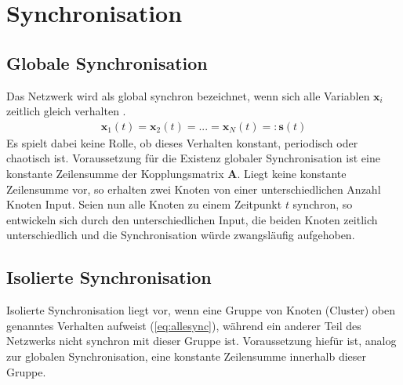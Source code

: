 \section{Synchronisation}
\subsection*{Globale Synchronisation}
Das Netzwerk wird als global synchron bezeichnet, wenn sich alle Variablen $\boldsymbol{x}_i$ zeitlich gleich verhalten \citep{pecora1998}.
\begin{align}\label{eq:allesync}
\boldsymbol{x}_1(t)=\boldsymbol{x}_2(t)=...=\boldsymbol{x}_N(t)=:\boldsymbol{s}(t)
\end{align}
Es spielt dabei keine Rolle, ob dieses Verhalten konstant, periodisch oder chaotisch ist.
Voraussetzung für die Existenz globaler Synchronisation ist eine konstante Zeilensumme der Kopplungsmatrix $\boldsymbol{A}$. Liegt keine konstante Zeilensumme vor, so erhalten zwei Knoten von einer unterschiedlichen Anzahl Knoten Input. Seien nun alle Knoten zu einem Zeitpunkt $t$ synchron, so entwickeln sich durch den unterschiedlichen Input, die beiden Knoten zeitlich unterschiedlich und die Synchronisation würde zwangsläufig aufgehoben.
\subsection*{Isolierte Synchronisation}
Isolierte Synchronisation liegt vor, wenn eine Gruppe von Knoten (Cluster) oben genanntes Verhalten aufweist (\ref{eq:allesync}), während ein anderer Teil des Netzwerks nicht synchron mit dieser Gruppe ist. Voraussetzung hiefür ist, analog zur globalen Synchronisation, eine konstante Zeilensumme innerhalb dieser Gruppe.

